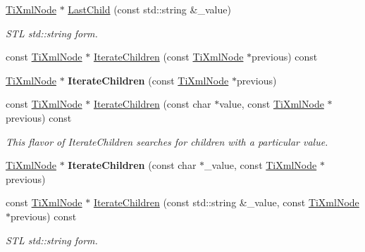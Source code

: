 \begin{DoxyCompactItemize}
\mbox{\label{class_ti_xml_node_a69772c9202f70553f940b15c06b07be3}} 
\hyperlink{class_ti_xml_node}{Ti\+Xml\+Node} $\ast$ \hyperlink{class_ti_xml_node_a69772c9202f70553f940b15c06b07be3}{Last\+Child} (const std\+::string \&\+\_\+value)
\begin{DoxyCompactList}\small\item\em S\+TL std\+::string form. \end{DoxyCompactList}\item 
const \hyperlink{class_ti_xml_node}{Ti\+Xml\+Node} $\ast$ \hyperlink{class_ti_xml_node_a67c3a02b797f08d9a31b2553661257e1}{Iterate\+Children} (const \hyperlink{class_ti_xml_node}{Ti\+Xml\+Node} $\ast$previous) const
\item 
\mbox{\label{class_ti_xml_node_a2358e747118fdbf0e467b1e4f7d03de1}} 
\hyperlink{class_ti_xml_node}{Ti\+Xml\+Node} $\ast$ {\bfseries Iterate\+Children} (const \hyperlink{class_ti_xml_node}{Ti\+Xml\+Node} $\ast$previous)
\item 
\mbox{\label{class_ti_xml_node_a74bc68a536c279a42af346cb1454f143}} 
const \hyperlink{class_ti_xml_node}{Ti\+Xml\+Node} $\ast$ \hyperlink{class_ti_xml_node_a74bc68a536c279a42af346cb1454f143}{Iterate\+Children} (const char $\ast$value, const \hyperlink{class_ti_xml_node}{Ti\+Xml\+Node} $\ast$previous) const
\begin{DoxyCompactList}\small\item\em This flavor of Iterate\+Children searches for children with a particular \textquotesingle{}value\textquotesingle{}. \end{DoxyCompactList}\item 
\mbox{\label{class_ti_xml_node_a67ba8275e533e6f76340236c42ea0aea}} 
\hyperlink{class_ti_xml_node}{Ti\+Xml\+Node} $\ast$ {\bfseries Iterate\+Children} (const char $\ast$\+\_\+value, const \hyperlink{class_ti_xml_node}{Ti\+Xml\+Node} $\ast$previous)
\item 
\mbox{\label{class_ti_xml_node_a412c25b2b7e6709a4b291b13df0632eb}} 
const \hyperlink{class_ti_xml_node}{Ti\+Xml\+Node} $\ast$ \hyperlink{class_ti_xml_node_a412c25b2b7e6709a4b291b13df0632eb}{Iterate\+Children} (const std\+::string \&\+\_\+value, const \hyperlink{class_ti_xml_node}{Ti\+Xml\+Node} $\ast$previous) const
\begin{DoxyCompactList}\small\item\em S\+TL std\+::string form. \end{DoxyCompactList}\item 

\end{DoxyCompactItemize}
